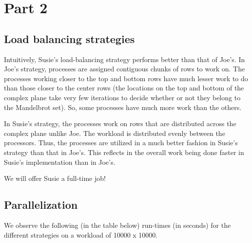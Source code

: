 \section{Part 2}
\label{sec:part2}

\subsection{Load balancing strategies}

Intuitively, Susie's load-balancing strategy performs better than that of Joe's. In Joe's strategy, processes are assigned contiguous chunks of rows to work on. The processes working closer to the top and bottom rows have much lesser work to do than those closer to the center rows (the locations on the top and bottom of the complex plane take very few iterations to decide whether or not they belong to the Mandelbrot set). So, some processes have much more work than the others.

In Susie's strategy, the processes work on rows that are distributed across the complex plane unlike Joe. The workload is distributed evenly between the processors. Thus, the processes are utilized in a much better fashion in Susie's strategy than that in Joe's. This reflects in the overall work being done faster in Susie's implementation than in Joe's. 

We will offer Susie a full-time job!

\subsection{Parallelization}

We observe the following (in the table below) run-times (in seconds) for the different strategies on a workload of 10000 x 10000.


